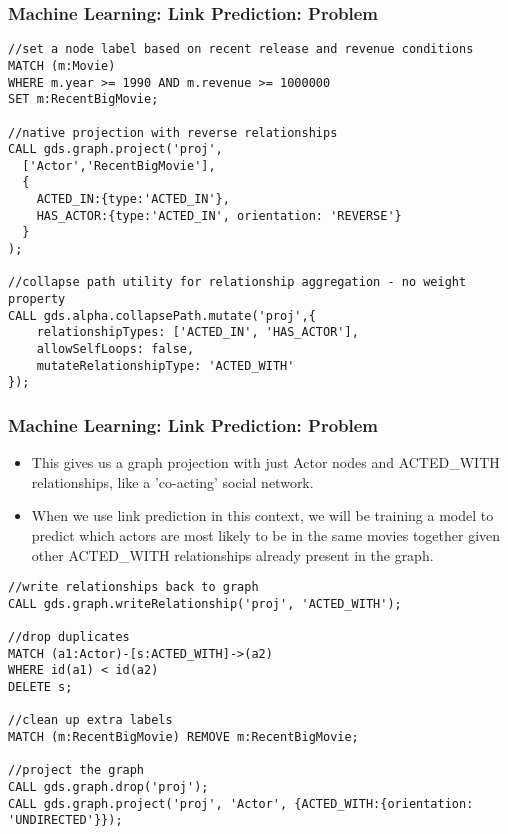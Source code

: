 \begin{frame}[fragile]\frametitle{Machine Learning: Link Prediction: Problem}



\begin{lstlisting}
//set a node label based on recent release and revenue conditions
MATCH (m:Movie)
WHERE m.year >= 1990 AND m.revenue >= 1000000
SET m:RecentBigMovie;

//native projection with reverse relationships
CALL gds.graph.project('proj',
  ['Actor','RecentBigMovie'],
  {
  	ACTED_IN:{type:'ACTED_IN'},
    HAS_ACTOR:{type:'ACTED_IN', orientation: 'REVERSE'}
  }
);

//collapse path utility for relationship aggregation - no weight property
CALL gds.alpha.collapsePath.mutate('proj',{
    relationshipTypes: ['ACTED_IN', 'HAS_ACTOR'],
    allowSelfLoops: false,
    mutateRelationshipType: 'ACTED_WITH'
});
\end{lstlisting}

\end{frame}
\begin{frame}[fragile]\frametitle{Machine Learning: Link Prediction: Problem}

\begin{itemize}
\item This gives us a graph projection with just Actor nodes and ACTED\_WITH relationships, like a 'co-acting' social network. 
\item When we use link prediction in this context, we will be training a model to predict which actors are most likely to be in the same movies together given other ACTED\_WITH relationships already present in the graph. 
\end{itemize}

\begin{lstlisting}
//write relationships back to graph
CALL gds.graph.writeRelationship('proj', 'ACTED_WITH');

//drop duplicates
MATCH (a1:Actor)-[s:ACTED_WITH]->(a2)
WHERE id(a1) < id(a2)
DELETE s;

//clean up extra labels
MATCH (m:RecentBigMovie) REMOVE m:RecentBigMovie;

//project the graph
CALL gds.graph.drop('proj');
CALL gds.graph.project('proj', 'Actor', {ACTED_WITH:{orientation: 'UNDIRECTED'}});
\end{lstlisting}

\end{frame}

